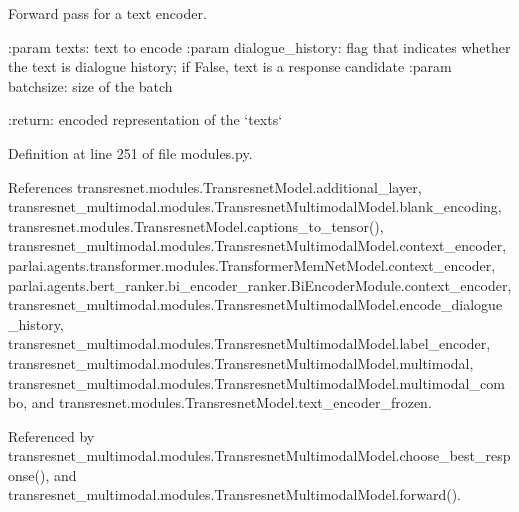 \begin{DoxyVerb}Forward pass for a text encoder.

:param texts:
    text to encode
:param dialogue_history:
    flag that indicates whether the text is dialogue history; if False,
    text is a response candidate
:param batchsize:
    size of the batch

:return:
    encoded representation of the `texts`
\end{DoxyVerb}
 

Definition at line 251 of file modules.\+py.



References transresnet.\+modules.\+Transresnet\+Model.\+additional\+\_\+layer, transresnet\+\_\+multimodal.\+modules.\+Transresnet\+Multimodal\+Model.\+blank\+\_\+encoding, transresnet.\+modules.\+Transresnet\+Model.\+captions\+\_\+to\+\_\+tensor(), transresnet\+\_\+multimodal.\+modules.\+Transresnet\+Multimodal\+Model.\+context\+\_\+encoder, parlai.\+agents.\+transformer.\+modules.\+Transformer\+Mem\+Net\+Model.\+context\+\_\+encoder, parlai.\+agents.\+bert\+\_\+ranker.\+bi\+\_\+encoder\+\_\+ranker.\+Bi\+Encoder\+Module.\+context\+\_\+encoder, transresnet\+\_\+multimodal.\+modules.\+Transresnet\+Multimodal\+Model.\+encode\+\_\+dialogue\+\_\+history, transresnet\+\_\+multimodal.\+modules.\+Transresnet\+Multimodal\+Model.\+label\+\_\+encoder, transresnet\+\_\+multimodal.\+modules.\+Transresnet\+Multimodal\+Model.\+multimodal, transresnet\+\_\+multimodal.\+modules.\+Transresnet\+Multimodal\+Model.\+multimodal\+\_\+combo, and transresnet.\+modules.\+Transresnet\+Model.\+text\+\_\+encoder\+\_\+frozen.



Referenced by transresnet\+\_\+multimodal.\+modules.\+Transresnet\+Multimodal\+Model.\+choose\+\_\+best\+\_\+response(), and transresnet\+\_\+multimodal.\+modules.\+Transresnet\+Multimodal\+Model.\+forward().

